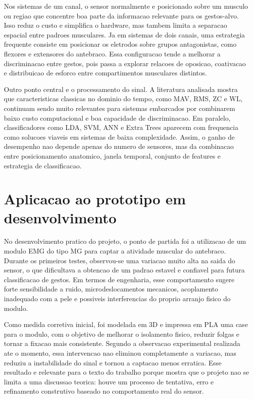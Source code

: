 \documentclass[12pt,oneside,a4paper,english,brazilian]{abntex2}
\begin{document}
Nos sistemas de um canal, o sensor normalmente e posicionado sobre um musculo ou regiao que concentre boa parte da informacao relevante para os gestos-alvo. Isso reduz o custo e simplifica o hardware, mas tambem limita a separacao espacial entre padroes musculares. Ja em sistemas de dois canais, uma estrategia frequente consiste em posicionar os eletrodos sobre grupos antagonistas, como flexores e extensores do antebraco. Essa configuracao tende a melhorar a discriminacao entre gestos, pois passa a explorar relacoes de oposicao, coativacao e distribuicao de esforco entre compartimentos musculares distintos.

Outro ponto central e o processamento do sinal. A literatura analisada mostra que caracteristicas classicas no dominio do tempo, como MAV, RMS, ZC e WL, continuam sendo muito relevantes para sistemas embarcados por combinarem baixo custo computacional e boa capacidade de discriminacao. Em paralelo, classificadores como LDA, SVM, ANN e Extra Trees aparecem com frequencia como solucoes viaveis em sistemas de baixa complexidade. Assim, o ganho de desempenho nao depende apenas do numero de sensores, mas da combinacao entre posicionamento anatomico, janela temporal, conjunto de features e estrategia de classificacao.

\section{Aplicacao ao prototipo em desenvolvimento}

No desenvolvimento pratico do projeto, o ponto de partida foi a utilizacao de um modulo EMG do tipo MG para captar a atividade muscular do antebraco. Durante os primeiros testes, observou-se uma variacao muito alta na saida do sensor, o que dificultava a obtencao de um padrao estavel e confiavel para futura classificacao de gestos. Em termos de engenharia, esse comportamento sugere forte sensibilidade a ruido, microdeslocamentos mecanicos, acoplamento inadequado com a pele e possiveis interferencias do proprio arranjo fisico do modulo.

Como medida corretiva inicial, foi modelada em 3D e impressa em PLA uma case para o modulo, com o objetivo de melhorar o isolamento fisico, reduzir folgas e tornar a fixacao mais consistente. Segundo a observacao experimental realizada ate o momento, essa intervencao nao eliminou completamente a variacao, mas reduziu a instabilidade do sinal e tornou a captacao menos erratica. Esse resultado e relevante para o texto do trabalho porque mostra que o projeto nao se limita a uma discussao teorica: houve um processo de tentativa, erro e refinamento construtivo baseado no comportamento real do sensor.
\end{document}

